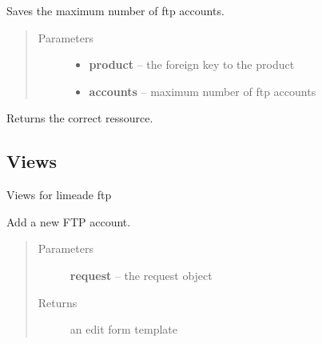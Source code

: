 \documentclass[letterpaper,10pt,english]{sphinxmanual}
\begin{document}
\begin{fulllineitems}
\label{api/ftp:limeade.ftp.models.Limitset}
Saves the maximum number of ftp accounts.
\begin{quote}\begin{description}
\item[{Parameters}] \leavevmode\begin{itemize}
\item {} 
\textbf{product} -- the foreign key to the product

\item {} 
\textbf{accounts} -- maximum number of ftp accounts

\end{itemize}

\end{description}\end{quote}

\begin{fulllineitems}
\label{api/ftp:limeade.ftp.models.Limitset.utilization}
Returns the correct ressource.

\end{fulllineitems}


\end{fulllineitems}



\subsection{Views}
\label{api/ftp:module-limeade.ftp.views}\label{api/ftp:views}
Views for limeade ftp

\begin{fulllineitems}
\label{api/ftp:limeade.ftp.views.account_add}
Add a new FTP account.
\begin{quote}\begin{description}
\item[{Parameters}] \leavevmode
\textbf{request} -- the request object

\item[{Returns}] \leavevmode
an edit form template

\end{description}\end{quote}

\end{fulllineitems}
\end{document}

